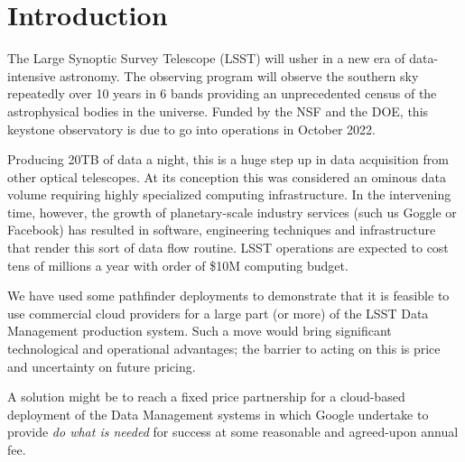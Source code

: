 \section{Introduction}
The Large Synoptic Survey Telescope (\gls{LSST}) will usher in a new era of data-intensive astronomy. The observing program will observe the southern sky repeatedly over 10 years in 6 bands providing an unprecedented census of the astrophysical bodies in the universe.  Funded by the \gls{NSF} and the \gls{DOE}, this keystone observatory is due to go into operations in October 2022.

Producing 20TB of data a night, this is a huge step up in data acquisition from other optical telescopes. At its conception this was considered an ominous data volume requiring highly specialized computing infrastructure. In the intervening time, however, the growth of planetary-scale industry services (such us Goggle or Facebook) has resulted in software, engineering techniques and infrastructure that render this sort of data flow routine. \gls{LSST}  operations are expected to cost tens of millions a year with order of \$10M computing budget.

We have used some pathfinder deployments to demonstrate that it is feasible to use commercial cloud providers for a large part (or more) of the \gls{LSST} \gls{Data Management} production system. Such a move would bring significant technological and operational advantages; the barrier to acting on this is price and uncertainty on future pricing.

A solution might be to reach a fixed price partnership for a cloud-based deployment of the \gls{Data Management} systems in which Google undertake to provide \emph{do what is needed} for success at some reasonable and agreed-upon annual fee.






